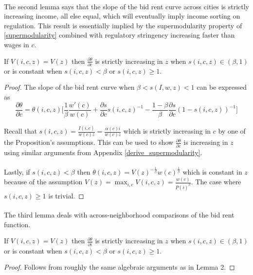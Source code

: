 \documentclass[12pt]{article}
\begin{document}
	\paragraph*{}
	The second lemma says that the slope of the bid rent curve across cities is strictly increasing income, all else equal, which will eventually imply income sorting on regulation. This result is essentially implied by the supermodularity property of \eqref{supermodularity} combined with regulatory stringency increasing faster than wages in $c$. 
	
	\begin{Lemma}
		If $V(i, c, z) = V(z)$ then $\frac{\partial \theta}{\partial c}$ is strictly increasing in $z$ when $s(i, c, z) \in (\beta, 1)$ or is constant when $s(i, c, z) < \beta$ or $s(i, c, z) \geq 1$. 
	\end{Lemma}
	\begin{proof}
		 The slope of the bid rent curve when $\beta < s(I, w, z) < 1$ can be expressed as $$\frac{\partial \theta}{\partial c} = \theta(i, c, z)\bigg[\frac{1}{\beta}\frac{w'(c)}{w(c)} + \frac{\partial s}{\partial c}s(i, c, z)^{-1} - \frac{1 - \beta}{\beta}\frac{\partial s}{\partial c}(1 - s(i, c, z))^{-1}\bigg]$$
		
		 Recall that $s(i, c, z) = \frac{I(i, c)}{w(c)z} = \frac{\alpha(c)i}{w(c)z}$ which is strictly increasing in $c$ by one of the Proposition's assumptions. This can be used to show $\frac{\partial \theta}{\partial c}$ is increasing in $z$ using similar arguments from Appendix \ref{derive_supermodularity}. 
		 
		 \paragraph*{}
		 Lastly, if $s(i, c, z) < \beta$ then  $\theta(i, c, z) = V(z)^{-\frac{1}{\beta}}w(c)^{\frac{1}{\beta}}$ which is constant in $z$ because of the assumption $V(z) = \max_{i, c}V(i, c, z) =  \frac{w(c)}{P(i)^{\beta}}$. The case where $s(i, c, z) \geq 1$ is trivial.
		  
	\end{proof} 
	
	\paragraph*{}
	The third lemma deals with across-neighborhood comparisons of the bid rent function. 
	\begin{Lemma}
		If $V(i, c, z) = V(z)$ then $\frac{\partial \theta}{\partial i}$ is strictly increasing in $z$ when $s(i, c, z) \in (\beta, 1)$ or is constant when $s(i, c, z) < \beta$ or $s(i, c, z) \geq 1$. 
		
		\begin{proof}
			Follows from roughly the same algebraic arguments as in Lemma 2.  
		\end{proof}
	\end{Lemma}
	
\end{document}
